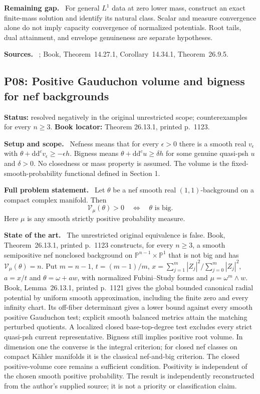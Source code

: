\documentclass[11pt]{article}
\newcommand{\ddc}{\mathrm d\mathrm d^c}
\newcommand{\field}[1]{\par\medskip\noindent\textbf{#1.}\ }
\begin{document}
\field{Remaining gap} For general $L^1$ data at zero lower mass, construct an exact finite-mass solution and identify its natural class. Scalar and measure convergence alone do not imply capacity convergence of normalized potentials. Root tails, dual attainment, and envelope genuineness are separate hypotheses.
\field{Sources} \cite{TW10,KN15,Nguyen16,ALS26}; Book, Theorem~14.27.1, Corollary~14.34.1, Theorem~26.9.5.
\subsection{P08: Positive Gauduchon volume and bigness for nef backgrounds}
\label{P08}
\noindent\textbf{Status:} resolved negatively in the original unrestricted scope; counterexamples for every $n\geq3$. \textbf{Book locator:} Theorem 26.13.1, printed p.~1123.
\field{Setup and scope} Nefness means that for every $\epsilon>0$ there is a smooth real $v_\epsilon$ with $\theta+\ddc v_\epsilon\geq-\epsilon h$. Bigness means $\theta+\ddc u\geq\delta h$ for some genuine quasi-psh $u$ and $\delta>0$. No closedness or mass property is assumed. The volume is the fixed-smooth-probability functional defined in Section 1.
\field{Full problem statement} Let $\theta$ be a nef smooth real $(1,1)$-background on a compact complex manifold. Then
\[
 \mathcal V_\mu(\theta)>0
 \quad\Longleftrightarrow\quad
 \theta\text{ is big}.
\]
Here $\mu$ is any smooth strictly positive probability measure.
\field{State of the art} The unrestricted original equivalence is false. Book, Theorem~26.13.1, printed p.~1123 constructs, for every $n\geq3$, a smooth semipositive nef nonclosed background on $\mathbb P^{n-1}\times\mathbb P^1$ that is not big and has $\mathcal V_\mu(\theta)=n$. Put $m=n-1$, $t=(m-1)/m$, $x=\sum_{j=1}^m|Z_j|^2/\sum_{j=0}^m|Z_j|^2$, $a=x/t$ and $\theta=\omega+a w$, with normalized Fubini--Study forms and $\mu=\omega^m\wedge w$. Book, Lemma~26.13.1, printed p.~1121 gives the global bounded canonical radial potential by uniform smooth approximation, including the finite zero and every infinity chart. Its off-fiber determinant gives a lower bound against every smooth positive Gauduchon test; explicit smooth balanced metrics attain the matching perturbed quotients. A localized closed base-top-degree test excludes every strict quasi-psh current representative. Bigness still implies positive root volume. In dimension one the converse is the integral criterion; for closed nef classes on compact K\"ahler manifolds it is the classical nef-and-big criterion. The closed positive-volume core remains a sufficient condition. Positivity is independent of the chosen smooth positive probability. The result is independently reconstructed from the author's supplied source; it is not a priority or classification claim.
\end{document}
